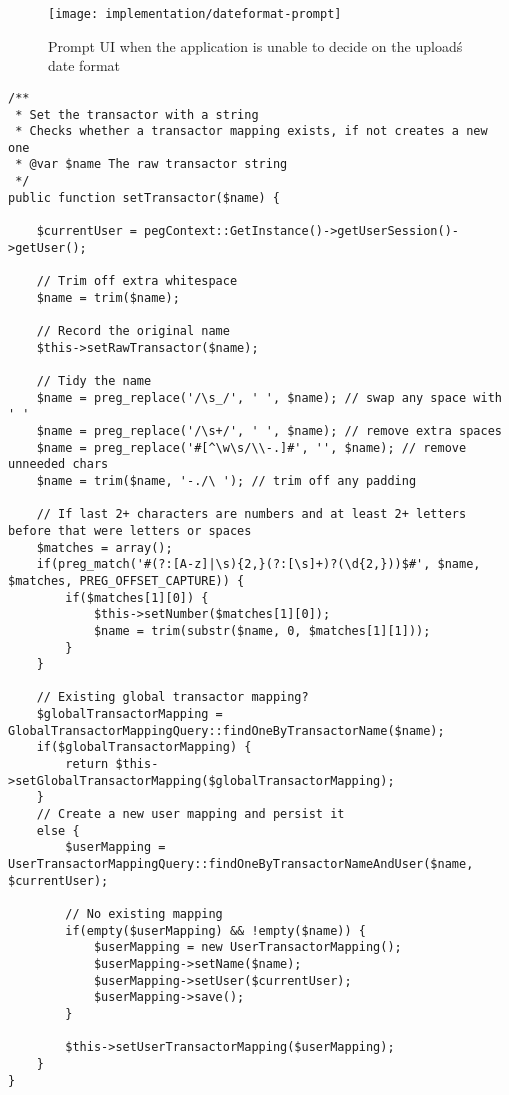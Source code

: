 \begin{figure}[h]
    \centering
    \texttt{[image: implementation/dateformat-prompt]}
    \caption{Prompt UI when the application is unable to decide on the upload\'s date format}
    \label{fig:dateformat-prompt}
\end{figure}

\lstset{style=phpcolor}
\begin{lstlisting}[float,floatplacement=H]
/**
 * Set the transactor with a string
 * Checks whether a transactor mapping exists, if not creates a new one
 * @var $name The raw transactor string
 */
public function setTransactor($name) {
	
	$currentUser = pegContext::GetInstance()->getUserSession()->getUser();
	
	// Trim off extra whitespace
	$name = trim($name);
	
	// Record the original name
	$this->setRawTransactor($name);
	
	// Tidy the name
	$name = preg_replace('/\s_/', ' ', $name); // swap any space with ' '
	$name = preg_replace('/\s+/', ' ', $name); // remove extra spaces
	$name = preg_replace('#[^\w\s/\\-.]#', '', $name); // remove unneeded chars
	$name = trim($name, '-./\ '); // trim off any padding
	
	// If last 2+ characters are numbers and at least 2+ letters before that were letters or spaces
	$matches = array();
	if(preg_match('#(?:[A-z]|\s){2,}(?:[\s]+)?(\d{2,}))$#', $name, $matches, PREG_OFFSET_CAPTURE)) {
		if($matches[1][0]) {
			$this->setNumber($matches[1][0]);
			$name = trim(substr($name, 0, $matches[1][1]));
		}
	}

	// Existing global transactor mapping?
	$globalTransactorMapping = GlobalTransactorMappingQuery::findOneByTransactorName($name);
	if($globalTransactorMapping) {
		return $this->setGlobalTransactorMapping($globalTransactorMapping);
	}
	// Create a new user mapping and persist it
	else {
		$userMapping = UserTransactorMappingQuery::findOneByTransactorNameAndUser($name, $currentUser);
		
		// No existing mapping
		if(empty($userMapping) && !empty($name)) {	
			$userMapping = new UserTransactorMapping();
			$userMapping->setName($name);
			$userMapping->setUser($currentUser);
			$userMapping->save();
		}
		
		$this->setUserTransactorMapping($userMapping);
	}
}
\end{lstlisting}

